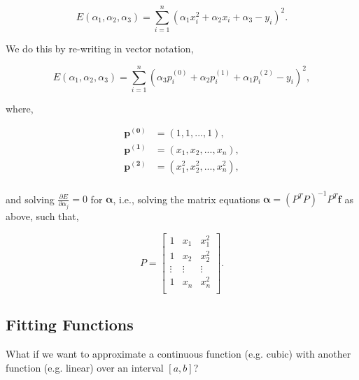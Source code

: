 \documentclass[12pt]{article}
\begin{document}
\vspace{4mm}

$$ E(\alpha_1, \alpha_2, \alpha_3) = \sum_{i=1}^n \left(\alpha_1 x_i^2 + \alpha_2 x_i + \alpha_3 - y_i\right)^2.  $$

\vspace{5mm}

We do this by re-writing in vector notation, 

\vspace{4mm}

$$ E(\alpha_1, \alpha_2, \alpha_3) = \sum_{i=1}^n \left(\alpha_3 p_i^{(0)} + \alpha_2 p_i^{(1)} + \alpha_1 p_i^{(2)} - y_i\right)^2, $$

\vspace{5mm}

where, 

\begin{align*}
\boldsymbol{p^{(0)}} &= (1, 1, ..., 1),\\
\boldsymbol{p^{(1)}} &= (x_1, x_2, ..., x_n),\\ 
\boldsymbol{p^{(2)}} &= (x_1^2, x_2^2, ..., x_n^2),\\
\end{align*}

and solving $\frac{\partial E}{\partial \alpha_j} = 0$ for $\boldsymbol{\alpha}$, i.e., solving the matrix equations $\boldsymbol{\alpha} = (P^TP)^{-1}P^T\mathbf{f}$ as above, such that,

\vspace{4mm}

\[
P =
\begin{bmatrix}
  	1 & x_1 & x_1^2 \\
    1 & x_2 & x_2^2 \\
    \vdots & \vdots & \vdots \\
    1 & x_n & x_n^2 \\
\end{bmatrix}.
\]

\newpage

\subsection{Fitting Functions}

\vspace{4mm}

What if we want to approximate a continuous function (e.g. cubic) with another function (e.g. linear) over an interval $[a,b]$?

\vspace{5mm}
\end{document}

